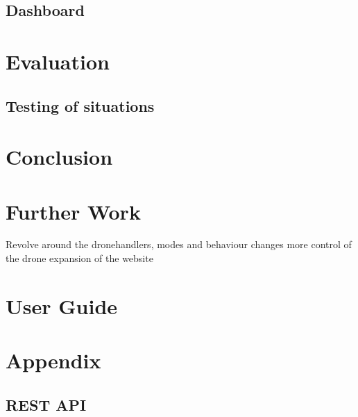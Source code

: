 \documentclass{article}
\begin{document}
\subsection{Dashboard}

\section{Evaluation}

\subsection{Testing of situations}






\section{Conclusion}



\section{Further Work}
 Revolve around the dronehandlers, modes and behaviour changes
 more control of the drone
 expansion of the website

\section{User Guide}\label{UserGuide}









\section{Appendix}

\subsection{REST API} \label{apdxRestApi}
\end{document}
